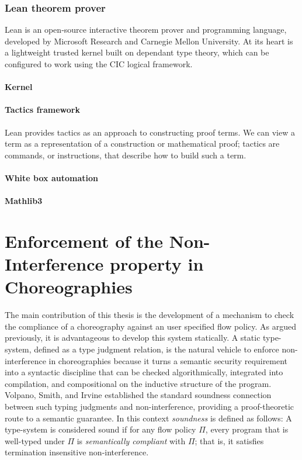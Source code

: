 \documentclass[12pt,a4paper,twoside]{book}
\begin{document}
\subsection{Lean theorem prover}
Lean is an open‑source interactive theorem prover and programming language, developed by Microsoft Research and Carnegie Mellon University. At its heart is a lightweight trusted kernel built on dependant type theory, which can be configured to work using the CIC logical framework.
\subsubsection{Kernel}
\subsubsection{Tactics framework}
Lean provides tactics as an approach to constructing proof terms.
We can view a term as a representation of a construction or mathematical
proof; tactics are commands, or instructions, that describe how to build such a
term.
\subsubsection{White box automation}
\subsubsection{Mathlib3}

\chapter{Enforcement of the Non-Interference property in Choreographies}
The main contribution of this thesis is the development of a mechanism to check the compliance of a choreography against an user specified flow policy.
As argued previously, it is advantageous to develop this system statically.
A static type-system, defined as a type judgment relation, is the natural vehicle to enforce non-interference in choreographies because it turns a semantic security requirement into a syntactic discipline that can be checked algorithmically, integrated into compilation, and compositional on the inductive structure of the program.
Volpano, Smith, and Irvine\cite{volpano1996sound} established the standard soundness connection between such typing judgments and non-interference, providing a proof-theoretic route to a semantic guarantee. In this context \textit{soundness} is defined as follows: 
A type-system is considered sound if for any flow policy $\Pi$, every program that is well-typed under $\Pi$ is \textit{semantically compliant} with $\Pi$; that is, it satisfies termination insensitive non-interference.
\end{document}
